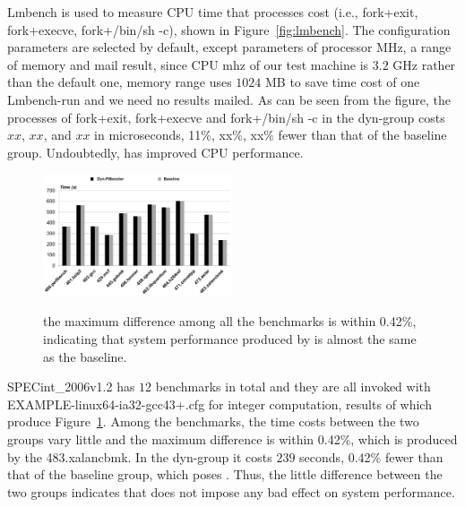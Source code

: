 Lmbench is used to measure CPU time that processes cost (i.e., fork+exit, fork+execve, fork+/bin/sh -c), shown in Figure~\ref{fig:lmbench}. The configuration parameters are selected by default, except parameters of processor MHz, a range of memory and mail result, since CPU mhz of our test machine is $3.2$ GHz rather than the default one, memory range uses $1024$ MB to save time cost of one Lmbench-run and we need no results mailed. As can be seen from the figure, the processes of fork+exit, fork+execve and fork+/bin/sh -c in the dyn-\name group costs $xx$, $xx$, and $xx$ in microseconds, 11\%, xx\%, xx\% fewer than that of the baseline group. Undoubtedly, \name has improved CPU performance.

\begin{figure}[htp]
\centering
\includegraphics[width=0.5\textwidth]{image/macro/spec.png} \\
\caption{the maximum difference among all the benchmarks is within 0.42\%, indicating that system performance produced by \name is almost the same as the baseline.}
\label{fig:spec}
\end{figure}

SPECint\_2006v1.2 has $12$ benchmarks in total and they are all invoked with EXAMPLE-linux64-ia32-gcc43+.cfg for integer computation, results of which produce Figure~\ref{fig:spec}. Among the benchmarks, the time costs between the two groups vary little and the maximum difference is within 0.42\%, which is produced by the 483.xalancbmk. In the dyn-\name group it costs $239$ seconds, 0.42\% fewer than that of the baseline group, which poses . Thus, the little difference between the two groups indicates that \name does not impose any bad effect on system performance.






